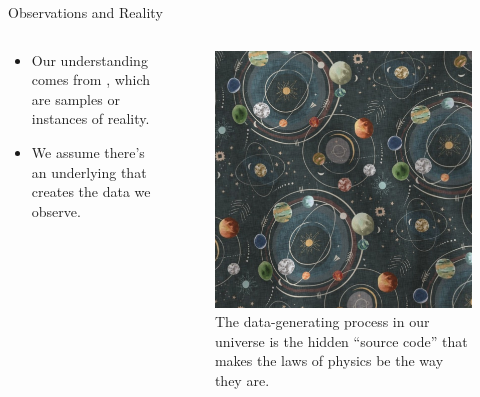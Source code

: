 \begin{frame}{Observations and Reality}
  \begin{columns}[c]
    \begin{column}{0.6\linewidth}
      \begin{itemize}
        \item Our understanding comes from , which are samples or instances of reality.
        \item We assume there's an underlying  that creates the data we observe.
      \end{itemize}
    \end{column}
    \begin{column}{0.4\linewidth}
      \begin{figure}
        \centering
        \includegraphics[width=\columnwidth]{images/universe.jpg}
        \caption{The data-generating process in our universe is the hidden ``source code'' that makes the laws of physics be the way they are. }
      \end{figure}
    \end{column}
  \end{columns}
\end{frame}

